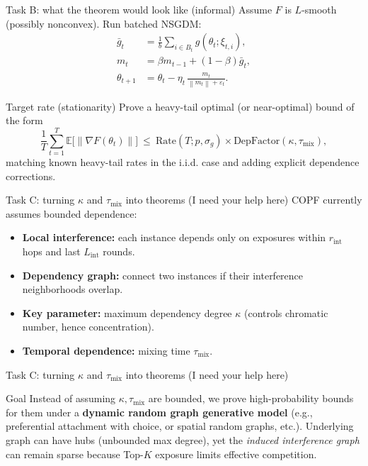 \documentclass[aspectratio=169,11pt]{beamer}
\newcommand{\1}{\mathbbm{1}}
\newcommand{\E}{\mathbb{E}}
\newcommand{\norm}[1]{\left\lVert#1\right\rVert}
\begin{document}
\begin{frame}{Task B: what the theorem would look like (informal)}
\small
Assume $F$ is $L$-smooth (possibly nonconvex). Run batched NSGDM:
\begin{align*}
\bar g_t &= \frac{1}{b}\sum_{i\in B_t} g(\theta_t;\xi_{t,i}),\\
m_t &= \beta m_{t-1} + (1-\beta)\bar g_t,\\
\theta_{t+1} &= \theta_t - \eta_t\, \frac{m_t}{\norm{m_t}+\varepsilon_t}.
\end{align*}

\begin{block}{Target rate (stationarity)}
\small
Prove a heavy-tail optimal (or near-optimal) bound of the form
\[
\frac{1}{T}\sum_{t=1}^T \E\big[\norm{\nabla F(\theta_t)}\big]
\ \le\ \mathrm{Rate}(T;p,\sigma_g)\times \mathrm{DepFactor}(\kappa,\tau_{\mathrm{mix}}),
\]
matching known heavy-tail rates in the i.i.d. case and adding explicit dependence corrections.
\end{block}


\end{frame}

\begin{frame}{Task C: turning $\kappa$ and $\tau_{\mathrm{mix}}$ into theorems (I need your help here)}
\small
COPF currently assumes bounded dependence:
\begin{itemize}
  \item \textbf{Local interference:} each instance depends only on exposures within $r_{\mathrm{int}}$ hops and last $L_{\mathrm{int}}$ rounds.
  \item \textbf{Dependency graph:} connect two instances if their interference neighborhoods overlap.
  \item \textbf{Key parameter:} maximum dependency degree $\kappa$ (controls chromatic number, hence concentration).
  \item \textbf{Temporal dependence:} mixing time $\tau_{\mathrm{mix}}$.
\end{itemize}
\end{frame}

\begin{frame}{Task C: turning $\kappa$ and $\tau_{\mathrm{mix}}$ into theorems (I need your help here)}
\begin{block}{Goal}
\small
Instead of assuming $\kappa,\tau_{\mathrm{mix}}$ are bounded, we prove high-probability bounds for them
under a \textbf{dynamic random graph generative model} (e.g., preferential attachment with choice, or spatial random graphs, etc.). Underlying graph can have hubs (unbounded max degree), yet the \emph{induced interference graph}
can remain sparse because Top-$K$ exposure limits effective competition.
\end{block}


\end{frame}
\end{document}
